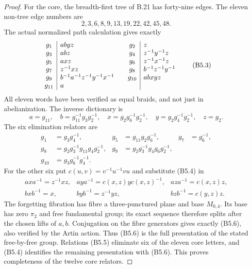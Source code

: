 \begin{proof}
For the core, the breadth-first tree of B.21 has forty-nine edges.
The eleven non-tree edge numbers are
\[
                 2,3,6,8,9,13,19,22,42,45,48.
\]
The actual normalized path calculation gives exactly
\[
\begin{array}{c|l@{\qquad}c|l}
 g_1&abyz&g_2&z\\
 g_3&abz&g_4&z^{-1}y^{-1}z\\
 g_5&axz&g_6&z^{-1}x^{-1}z\\
 g_7&z^{-1}xz&g_8&b^{-1}z^{-1}y^{-1}\\
 g_9&b^{-1}a^{-1}z^{-1}y^{-1}x^{-1}&g_{10}&abxyz\\
 g_{11}&a&&
\end{array}                                                     \tag{B5.3}
\]
All eleven words have been verified as equal braids, and not just in
abelianization.  The inverse dictionary is
\[
 a=g_{11},\quad b=g_{11}^{-1}g_3g_2^{-1},\quad
 x=g_2g_6^{-1}g_2^{-1},\quad
 y=g_2g_4^{-1}g_2^{-1},\quad z=g_2.                          \tag{B5.4}
\]
The six elimination relators are
\[
\begin{aligned}
 g_1&=g_3g_4^{-1},&g_5&=g_{11}g_2g_6^{-1},&g_7&=g_6^{-1},\\
 g_8&=g_2g_3^{-1}g_{11}g_4g_2^{-1},&
 g_9&=g_2g_3^{-1}g_4g_6g_2^{-1},\\
 g_{10}&=g_3g_6^{-1}g_4^{-1}.
\end{aligned}                                                   \tag{B5.5}
\]
For the other six put $c(u,v)=v^{-1}u^{-1}vu$ and substitute (B5.4)
in
\[
\begin{array}{lll}
 axa^{-1}=z^{-1}xz,&aya^{-1}=c(x,z)yc(x,z)^{-1},&aza^{-1}=c(x,z)z,\\
 bxb^{-1}=x,&byb^{-1}=z^{-1}yz,&bzb^{-1}=c(y,z)z.
\end{array}                                                     \tag{B5.6}
\]
The forgetting fibration has fibre a three-punctured plane and base
$M_{0,4}$.  Its base has zero $\pi_2$ and free fundamental group;
its exact sequence therefore splits after the chosen lifts of $a,b$.
Conjugation on the fibre generators gives exactly (B5.6), also verified
by the Artin action.  Thus (B5.6) is the full presentation of the stated
free-by-free group.  Relations (B5.5) eliminate six of the eleven core
letters, and (B5.4) identifies the remaining presentation with (B5.6).
This proves completeness of the twelve core relators.


\end{proof}
